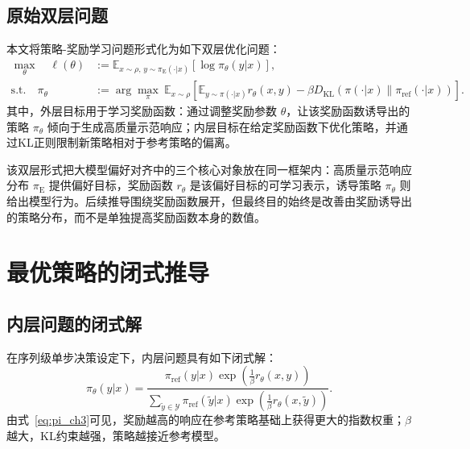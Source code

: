 \subsection{原始双层问题}

本文将策略-奖励学习问题形式化为如下双层优化问题：
\begin{equation}
\begin{aligned}
    \max_{\theta}\quad \ell(\theta)
    &:=\mathbb{E}_{x\sim\rho,\,y\sim\pi_{\mathrm{E}}(\cdot|x)}
    \left[\log \pi_\theta(y|x)\right],\\
    \mathrm{s.t.}\quad
    \pi_\theta
    &:=\arg\max_\pi\ \mathbb{E}_{x\sim\rho}
    \left[
    \mathbb{E}_{y\sim\pi(\cdot|x)} r_\theta(x,y)
    -\beta D_{\mathrm{KL}}\!\left(\pi(\cdot|x)\|\pi_{\mathrm{ref}}(\cdot|x)\right)
    \right].
    \label{eq:original_ch3}
\end{aligned}
\end{equation}
其中，外层目标用于学习奖励函数：通过调整奖励参数 $\theta$，让该奖励函数诱导出的策略 $\pi_\theta$ 倾向于生成高质量示范响应；内层目标在给定奖励函数下优化策略，并通过KL正则限制新策略相对于参考策略的偏离。

该双层形式把大模型偏好对齐中的三个核心对象放在同一框架内：高质量示范响应分布 $\pi_{\mathrm{E}}$ 提供偏好目标，奖励函数 $r_\theta$ 是该偏好目标的可学习表示，诱导策略 $\pi_\theta$ 则给出模型行为。后续推导围绕奖励函数展开，但最终目的始终是改善由奖励诱导出的策略分布，而不是单独提高奖励函数本身的数值。

\section{最优策略的闭式推导}

\subsection{内层问题的闭式解}

在序列级单步决策设定下，内层问题具有如下闭式解：
\begin{equation}
    \pi_\theta(y|x)=
    \frac{\pi_{\mathrm{ref}}(y|x)\exp\left(\frac{1}{\beta}r_\theta(x,y)\right)}
    {\sum_{\tilde{y}\in\mathcal{Y}}\pi_{\mathrm{ref}}(\tilde{y}|x)\exp\left(\frac{1}{\beta}r_\theta(x,\tilde{y})\right)}.
    \label{eq:pi_ch3}
\end{equation}
由式~\eqref{eq:pi_ch3}可见，奖励越高的响应在参考策略基础上获得更大的指数权重；$\beta$ 越大，KL约束越强，策略越接近参考模型。



